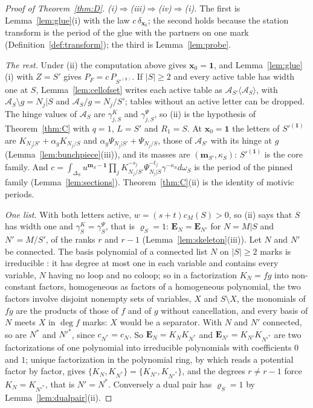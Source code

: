 \documentclass[11pt]{article}
\theoremstyle{plain}
\theoremstyle{definition}
\theoremstyle{remark}
\newcommand{\bm}{\mathbf m}
\newcommand{\bx}{\mathbf x}
\begin{document}
\begin{proof}[Proof of Theorem~\ref{thm:D}]
\emph{(i)$\Rightarrow$(iii)$\Rightarrow$(iv)$\Rightarrow$(i).} The first is Lemma~\ref{lem:glue}(i) with the law $c\,\delta_{\bx_0}$; the second holds because the station transform is the period of the glue with the partners on one mark (Definition~\ref{def:transform}); the third is Lemma~\ref{lem:probe}.

\emph{The rest.} Under (ii) the computation above gives $\bx_0=\mathbf 1$, and Lemma~\ref{lem:glue}(i) with $Z=S'$ gives $P_F=c\,P_{S'^{(\mathbf 1)}}$. If $|S|\ge2$ and every active table has width one at $S$, Lemma~\ref{lem:cellofset} writes each active table as $\mathcal A_{S'}\langle\mathcal A_S\rangle$, with $\mathcal A_S\setminus g=N_j|S$ and $\mathcal A_S/g=N_j/S'$; tables without an active letter can be dropped. The hinge values of $\mathcal A_S$ are $\gamma^K_{j,S}$ and $\gamma^\Psi_{j,S}$, so (ii) is the hypothesis of Theorem~\ref{thm:C} with $q=1$, $L=S'$ and $R_1=S$. At $\bx_0=\mathbf 1$ the letters of $S'^{(\mathbf 1)}$ are $K_{N_j|S'}+\alpha_gK_{N_j/S}$ and $\alpha_g\Psi_{N_j|S'}+\Psi_{N_j/S}$, those of $\mathcal A_{S'}$ with its hinge at $g$ (Lemma~\ref{lem:bunchpiece}(iii)), and its masses are $(\bm_{S'},\kappa_S)$: $S'^{(\mathbf 1)}$ is the core family. And $c=\int_{\Delta_S}u^{\bm_S-\mathbf 1}\prod_jK_{N_j/S'}^{-s_j}\Psi_{N_j|S}^{-t_j}\gamma^{-\kappa_S}d\omega_S$ is the period of the pinned family (Lemma~\ref{lem:sections}). Theorem~\ref{thm:C}(ii) is the identity of motivic periods.

\emph{One list.} With both letters active, $w=(s+t)c_M(S)>0$, so (ii) says that $S$ has width one and $\gamma^K_S=\gamma^\Psi_S$, that is $\varrho_S=1$: $\mathbf E_N=\mathbf E_{N'}$ for $N=M|S$ and $N'=M/S'$, of the ranks $r$ and $r-1$ (Lemma~\ref{lem:skeleton}(iii)). Let $N$ and $N'$ be connected. The basis polynomial of a connected list $N$ on $|S|\ge2$ marks is irreducible \cite[Thm.~7.9, p.~49]{F}: it has degree at most one in each variable and contains every variable, $N$ having no loop and no coloop; so in a factorization $K_N=fg$ into non-constant factors, homogeneous as factors of a homogeneous polynomial, the two factors involve disjoint nonempty sets of variables, $X$ and $S\setminus X$, the monomials of $fg$ are the products of those of $f$ and of $g$ without cancellation, and every basis of $N$ meets $X$ in $\deg f$ marks: $X$ would be a separator. With $N$ and $N'$ connected, so are $N^\ast$ and $N'^\ast$, since $c_{N^\ast}=c_N$. So $\mathbf E_N=K_NK_{N^\ast}$ and $\mathbf E_{N'}=K_{N'}K_{N'^\ast}$ are two factorizations of one polynomial into irreducible polynomials with coefficients $0$ and $1$; unique factorization in the polynomial ring, by which \cite[Thm.~10.6, p.~65]{F} reads a potential factor by factor, gives $\{K_N,K_{N^\ast}\}=\{K_{N'},K_{N'^\ast}\}$, and the degrees $r\neq r-1$ force $K_N=K_{N'^\ast}$, that is $N'=N^\ast$. Conversely a dual pair has $\varrho_S=1$ by Lemma~\ref{lem:dualpair}(ii).
\end{proof}
\end{document}
